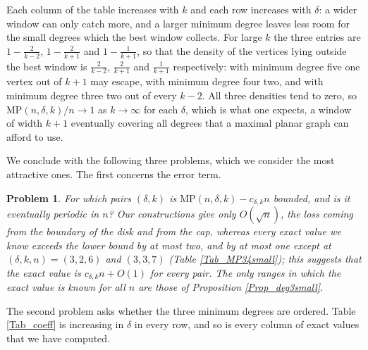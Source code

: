 \documentclass[12pt,a4paper]{article}%
\newtheorem{problem}[theorem]{Problem}
\begin{document}
Each column of the table increases with $k$ and each row increases with $\delta $: a wider window can
only catch more, and a larger minimum degree leaves less room for the small degrees which the best
window collects. For large $k$ the three entries are $1-\frac{2}{k-2}$, $1-\frac{2}{k+1}$ and
$1-\frac{1}{k+1}$, so that the density of the vertices lying outside the best window is $\frac{2}{k-2}$,
$\frac{2}{k+1}$ and $\frac{1}{k+1}$ respectively: with minimum degree five one vertex out of $k+1$
may escape, with minimum degree four two, and with minimum degree three two out of every $k-2$.
All three densities tend to zero, so $\mathrm{MP}(n,\delta ,k)/n\to 1$ as $k\to \infty $ for each
$\delta $, which is what one expects, a window of width $k+1$ eventually covering all degrees that a
maximal planar graph can afford to use.






We conclude with the following three problems, which we consider the most attractive ones. The first
concerns the error term.

\begin{problem}
\label{Pr_error}
For which pairs $(\delta ,k)$ is $\mathrm{MP}(n,\delta ,k)-c_{\delta ,k}n$ bounded, and is it
eventually periodic in $n$? Our constructions give only $O(\sqrt{n})$, the loss coming from the
boundary of the disk and from the cap, whereas every exact value we know exceeds the lower bound by
at most two, and by at most one except at $(\delta ,k,n)=(3,2,6)$ and $(3,3,7)$ (Table
\ref{Tab_MP34small}); this suggests that the exact value is $c_{\delta ,k}n+O(1)$ for every pair. The only
ranges in which the exact value is known for all $n$ are those of Proposition \ref{Prop_deg3small}.
\end{problem}

The second problem asks whether the three minimum degrees are ordered. Table \ref{Tab_coeff} is
increasing in $\delta $ in every row, and so is every column of exact values that we have computed.
\end{document}

